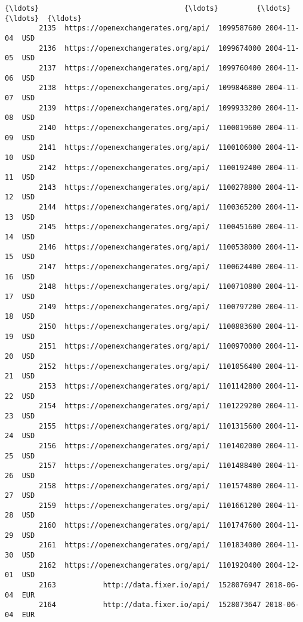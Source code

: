 \documentclass[11pt]{article}
\begin{document}
\begin{Verbatim}[commandchars=\\\{\}]
        {\ldots}                                  {\ldots}         {\ldots}        {\ldots}  {\ldots}   
        2135  https://openexchangerates.org/api/  1099587600 2004-11-04  USD   
        2136  https://openexchangerates.org/api/  1099674000 2004-11-05  USD   
        2137  https://openexchangerates.org/api/  1099760400 2004-11-06  USD   
        2138  https://openexchangerates.org/api/  1099846800 2004-11-07  USD   
        2139  https://openexchangerates.org/api/  1099933200 2004-11-08  USD   
        2140  https://openexchangerates.org/api/  1100019600 2004-11-09  USD   
        2141  https://openexchangerates.org/api/  1100106000 2004-11-10  USD   
        2142  https://openexchangerates.org/api/  1100192400 2004-11-11  USD   
        2143  https://openexchangerates.org/api/  1100278800 2004-11-12  USD   
        2144  https://openexchangerates.org/api/  1100365200 2004-11-13  USD   
        2145  https://openexchangerates.org/api/  1100451600 2004-11-14  USD   
        2146  https://openexchangerates.org/api/  1100538000 2004-11-15  USD   
        2147  https://openexchangerates.org/api/  1100624400 2004-11-16  USD   
        2148  https://openexchangerates.org/api/  1100710800 2004-11-17  USD   
        2149  https://openexchangerates.org/api/  1100797200 2004-11-18  USD   
        2150  https://openexchangerates.org/api/  1100883600 2004-11-19  USD   
        2151  https://openexchangerates.org/api/  1100970000 2004-11-20  USD   
        2152  https://openexchangerates.org/api/  1101056400 2004-11-21  USD   
        2153  https://openexchangerates.org/api/  1101142800 2004-11-22  USD   
        2154  https://openexchangerates.org/api/  1101229200 2004-11-23  USD   
        2155  https://openexchangerates.org/api/  1101315600 2004-11-24  USD   
        2156  https://openexchangerates.org/api/  1101402000 2004-11-25  USD   
        2157  https://openexchangerates.org/api/  1101488400 2004-11-26  USD   
        2158  https://openexchangerates.org/api/  1101574800 2004-11-27  USD   
        2159  https://openexchangerates.org/api/  1101661200 2004-11-28  USD   
        2160  https://openexchangerates.org/api/  1101747600 2004-11-29  USD   
        2161  https://openexchangerates.org/api/  1101834000 2004-11-30  USD   
        2162  https://openexchangerates.org/api/  1101920400 2004-12-01  USD   
        2163           http://data.fixer.io/api/  1528076947 2018-06-04  EUR   
        2164           http://data.fixer.io/api/  1528073647 2018-06-04  EUR   
        

\end{Verbatim}
\end{document}
